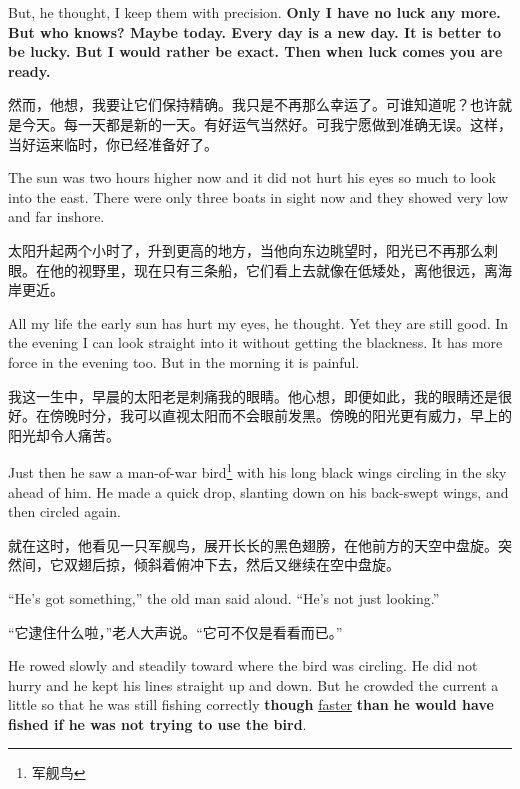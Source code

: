 \begin{paracol}{2}
But, he thought, I keep them with \gls{precision}.\textbf{ Only I have no
  luck any more. But who knows? Maybe today. Every day is a new day. It is
  better to be lucky. But I would rather be exact. Then when luck comes you
  are ready.}

\switchcolumn

然而，他想，我要让它们保持精确。我只是不再那么幸运了。可谁知道呢？也许就是今天。每一天都是新的一天。有好运气当然好。可我宁愿做到准确无误。这样，当好运来临时，你已经准备好了。

\switchcolumn*

The sun was two hours higher now and it did not hurt his eyes so much to
look into the east. There were only three boats in \gls{sight} now and they
showed very low and far \gls{inshore}.

\switchcolumn

太阳升起两个小时了，升到更高的地方，当他向东边眺望时，阳光已不再那么刺眼。在他的视野里，现在只有三条船，它们看上去就像在低矮处，离他很远，离海岸更近。

\switchcolumn*

All my life the early sun has hurt my eyes, he thought. Yet they are still
good. In the evening I can look straight into it without getting the
blackness. It has more \gls{force} in the evening too. But in the morning it is
\gls{painful}.

\switchcolumn

我这一生中，早晨的太阳老是刺痛我的眼睛。他心想，即便如此，我的眼睛还是很好。在傍晚时分，我可以直视太阳而不会眼前发黑。傍晚的阳光更有威力，早上的阳光却令人痛苦。

\switchcolumn*

Just then he saw a man-of-war bird\footnote{军舰鸟} with his long black
wings circling in the sky \gls{ahead} of him. He made a quick drop,
\gls{slanting} down on his back-swept wings, and then circled again.

\switchcolumn

就在这时，他看见一只军舰鸟，展开长长的黑色翅膀，在他前方的天空中盘旋。突然间，它双翅后掠，倾斜着俯冲下去，然后又继续在空中盘旋。

\switchcolumn*

``He's got something,'' the old man said aloud. ``He's not just looking.''

\switchcolumn

“它逮住什么啦，”老人大声说。“它可不仅是看看而已。”

\switchcolumn*

He rowed slowly and steadily toward where the bird was circling. He did not
hurry and he kept his lines straight up and down. But he \gls{crowded} the
current a little so that he was still fishing correctly \textbf{though}
\uline{faster} \textbf{than} \textbf{he would have fished if he was not trying
  to use the bird}.


\end{paracol}
